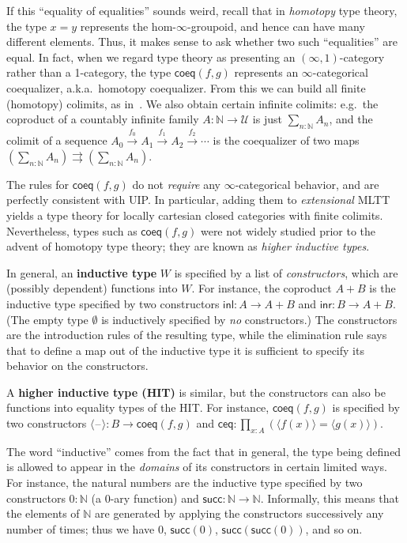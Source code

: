 \documentclass[12pt]{article}
\def\oo{\ensuremath{\infty}}
\def\io{\ensuremath{(\oo,1)}}
\def\N{\mathbb{N}}
\def\inl{\mathsf{inl}}
\def\inr{\mathsf{inr}}
\def\tprod{\textstyle\prod}
\def\U{\mathscr{U}}
\def\coeq{\mathsf{coeq}}
\def\classof#1{\langle #1\rangle}
\def\ceq{\mathsf{ceq}}
\newcommand{\blank}{\mathord{\hspace{1pt}\text{--}\hspace{1pt}}}
\def\succ{\mathsf{succ}}
\numberwithin{equation}{section}
\begin{document}
If this ``equality of equalities'' sounds weird, recall that in \emph{homotopy} type theory, the type $x=y$ represents the hom-$\oo$-groupoid, and hence can have many different elements.
Thus, it makes sense to ask whether two such ``equalities'' are equal.
In fact, when we regard type theory as presenting an $\io$-category rather than a 1-category, the type $\coeq(f,g)$ represents an $\oo$-categorical coequalizer, a.k.a.\ homotopy coequalizer.
From this we can build all finite (homotopy) colimits, as in~\cite[Corollary 4.4.2.4]{lurie:higher-topoi}.
We also obtain certain infinite colimits: e.g.\ the coproduct of a countably infinite family $A:\N\to\U$ is just $\sum_{n:\N} A_n$, and the co\-limit of a sequence $A_0 \xrightarrow{f_0} A_1 \xrightarrow{f_1} A_2 \xrightarrow{f_2} \cdots$ is the coequalizer of two maps $(\sum_{n:\N} A_n) \rightrightarrows (\sum_{n:\N} A_n)$.

The rules for $\coeq(f,g)$ do not \emph{require} any $\oo$-categorical behavior, and are perfectly consistent with UIP.
In particular, adding them to \emph{extensional} MLTT yields a type theory for locally cartesian closed categories with finite colimits.
Nevertheless, types such as $\coeq(f,g)$ were not widely studied prior to the advent of homotopy type theory;
they are known as \emph{higher inductive types}. %

In general, an \textbf{inductive type} $W$ is specified by a list of \emph{constructors}, which are (possibly dependent) functions into $W$.
For instance, the coproduct $A+B$ is the inductive type specified by two constructors $\inl : A \to A+B$ and $\inr : B \to A+B$.
(The empty type $\emptyset$ is inductively specified by \emph{no} constructors.)
The constructors are the introduction rules of the resulting type, while the elimination rule says that to define a map out of the inductive type it is sufficient to specify its behavior on the constructors.

A \textbf{higher inductive type (HIT)} is similar, but the constructors can also be functions into equality types of the HIT.
For instance, $\coeq(f,g)$ is specified by two constructors $\classof{\blank} : B\to \coeq(f,g)$ and $\ceq : \tprod_{x:A} (\classof{f(x)} = \classof{g(x)})$.

The word ``inductive'' comes from the fact that in general, the type being defined is allowed to appear in the \emph{domains} of its constructors in certain limited ways.
For instance, the natural numbers are the inductive type specified by two constructors $0:\N$ (a 0-ary function) and $\succ:\N\to\N$.
Informally, this means that the elements of $\N$ are generated by applying the constructors successively any number of times; thus we have $0$, $\succ(0)$, $\succ(\succ(0))$, and so on.
\end{document}
